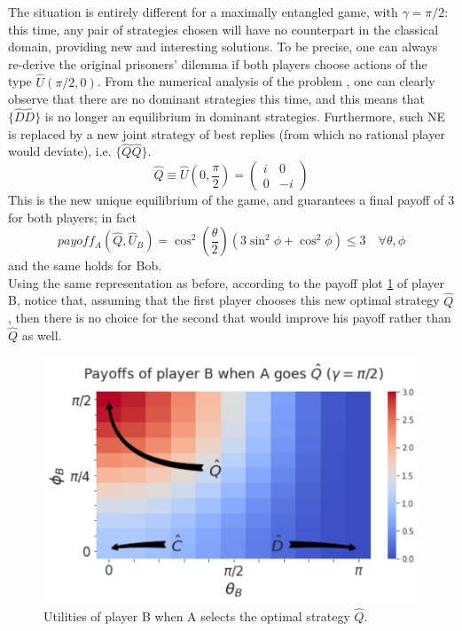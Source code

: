 The situation is entirely different for a maximally entangled game, with $\gamma=\pi/2$: this time, any pair of strategies chosen will have no counterpart in the classical domain, providing new and interesting solutions. To be precise, one can always re-derive the original prisoners' dilemma if both players choose actions of the type $\hat{U}(\pi/2,0)$. From the numerical analysis of the problem \cite{Pujatti_github}, one can clearly observe that there are no dominant strategies this time, and this means that $\{\hat{D}\hat{D}\}$ is no longer an equilibrium in dominant strategies. Furthermore, such NE is replaced by a new joint strategy of best replies (from which no rational player would deviate), i.e. $\{\hat{Q}\hat{Q}\}$. 
\[ \hat{Q} \equiv \hat{U}(0,\frac{\pi}{2}) = \begin{pmatrix} i&0\\0&-i \end{pmatrix} \]
This is the new unique equilibrium of the game, and guarantees a final payoff of 3 for both players; in fact
\[ payoff_A(\hat{Q},\hat{U}_B)=\cos^2\left(\frac{\theta}{2}\right)\left(3\sin^2\phi + \cos^2\phi \right)\leq 3 \quad \forall\theta,\phi \]
and the same holds for Bob.\\
Using the same representation as before, according to the payoff plot \ref{fig:utilBvsQ} of player B, notice that, assuming that the first player chooses this new optimal strategy $\hat{Q}$, then there is no choice for the second that would improve his payoff rather than $\hat{Q}$ as well.\\ 

\begin{figure}[!ht]
	\centering
	\includegraphics[scale=0.5]{pictures/payoffsBvsQ.pdf}
	\caption{Utilities of player B when A selects the optimal strategy $\hat{Q}$.}
	\label{fig:utilBvsQ}
\end{figure}


